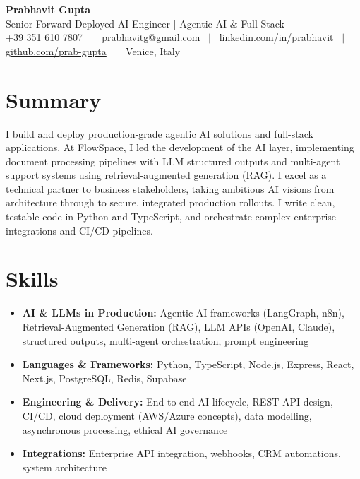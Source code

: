 \documentclass[a4paper,10pt]{article}
\begin{document}
\begin{center}
 {\Huge\bfseries Prabhavit Gupta}\\[3pt]
 {\color{accent}\large Senior Forward Deployed AI Engineer | Agentic AI \& Full-Stack}\\[6pt]
 {\footnotesize +39 351 610 7807 ~$\vert$~
 \href{mailto:prabhavitg@gmail.com}{prabhavitg@gmail.com} ~$\vert$~
 \href{https://www.linkedin.com/in/prabhavit/}{linkedin.com/in/prabhavit} ~$\vert$~
 \href{https://github.com/prab-gupta}{github.com/prab-gupta} ~$\vert$~
 Venice, Italy}
\end{center}
\vspace{-2pt}

\section{Summary}
I build and deploy production-grade agentic AI solutions and full-stack applications. At FlowSpace, I led the development of the AI layer, implementing document processing pipelines with LLM structured outputs and multi-agent support systems using retrieval-augmented generation (RAG). I excel as a technical partner to business stakeholders, taking ambitious AI visions from architecture through to secure, integrated production rollouts. I write clean, testable code in Python and TypeScript, and orchestrate complex enterprise integrations and CI/CD pipelines.

\section{Skills}
\begin{itemize}
 \item \textbf{AI \& LLMs in Production:} Agentic AI frameworks (LangGraph, n8n), Retrieval-Augmented Generation (RAG), LLM APIs (OpenAI, Claude), structured outputs, multi-agent orchestration, prompt engineering
 \item \textbf{Languages \& Frameworks:} Python, TypeScript, Node.js, Express, React, Next.js, PostgreSQL, Redis, Supabase
 \item \textbf{Engineering \& Delivery:} End-to-end AI lifecycle, REST API design, CI/CD, cloud deployment (AWS/Azure concepts), data modelling, asynchronous processing, ethical AI governance
 \item \textbf{Integrations:} Enterprise API integration, webhooks, CRM automations, system architecture
\end{itemize}
\end{document}
